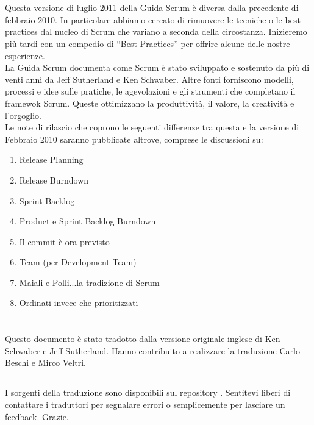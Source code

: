 \newpage
\section*{\color{Blue}{Revisioni}}%
\label{sec:revisions}
Questa versione di luglio 2011 della Guida Scrum è diversa dalla precedente di febbraio 2010. In particolare abbiamo cercato di 
rimuovere le tecniche o le best practices dal nucleo di Scrum che variano a seconda della circostanza. Inizieremo pi\`u 
tardi con un compedio di ``Best Practices'' per offrire alcune delle nostre esperienze. \newline
\\La Guida Scrum documenta come Scrum \`e stato sviluppato e sostenuto da pi\`u di venti anni da Jeff Sutherland e Ken Schwaber. 
Altre fonti forniscono modelli, processi e idee sulle pratiche, le agevolazioni e gli strumenti che completano il framewok 
Scrum. Queste ottimizzano la produttività, il valore, la creatività e l'orgoglio. \newline
\\Le note di rilascio che coprono le seguenti differenze tra questa e la versione di Febbraio 2010 saranno pubblicate altrove, 
comprese le discussioni su:

\begin{enumerate}
 	\item Release Planning
	\item Release Burndown
	\item Sprint Backlog
	\item Product e Sprint Backlog Burndown
	\item Il commit \`e ora previsto
	\item Team (per Development Team)
	\item Maiali e Polli...la tradizione di Scrum
	\item Ordinati invece che prioritizzati 
\end{enumerate}

\newpage
\section*{\color{Blue}{Traduzione}}%
\label{sec:translation}
Questo documento \`e stato tradotto dalla versione originale inglese di Ken Schwaber e Jeff Sutherland. Hanno contribuito a 
realizzare la traduzione Carlo Beschi e Mirco Veltri.

\subsection*{\color{SteelBlue}{Note alla versione italiana}}%
\label{sec:transnotes}
I sorgenti della traduzione sono disponibili sul repository . 
Sentitevi liberi di contattare i traduttori per segnalare errori o semplicemente per lasciare un feedback. Grazie.

